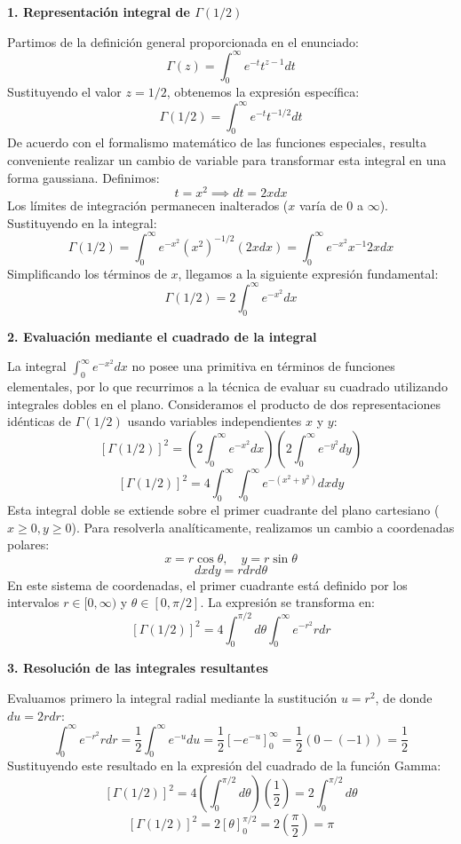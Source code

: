 \documentclass[a4paper]{article}
\begin{document}
\textbf{1. Representación integral de $\Gamma(1/2)$}

Partimos de la definición general proporcionada en el enunciado:
$$ \Gamma(z) = \int_{0}^{\infty} e^{-t} t^{z-1} dt $$
Sustituyendo el valor $z = 1/2$, obtenemos la expresión específica:
$$ \Gamma(1/2) = \int_{0}^{\infty} e^{-t} t^{-1/2} dt $$
De acuerdo con el formalismo matemático de las funciones especiales, resulta conveniente realizar un cambio de variable para transformar esta integral en una forma gaussiana. Definimos:
$$ t = x^2 \implies dt = 2x dx $$
Los límites de integración permanecen inalterados ($x$ varía de $0$ a $\infty$). Sustituyendo en la integral:
$$ \Gamma(1/2) = \int_{0}^{\infty} e^{-x^2} (x^2)^{-1/2} (2x dx) = \int_{0}^{\infty} e^{-x^2} x^{-1} 2x dx $$
Simplificando los términos de $x$, llegamos a la siguiente expresión fundamental:
$$ \Gamma(1/2) = 2 \int_{0}^{\infty} e^{-x^2} dx $$

\textbf{2. Evaluación mediante el cuadrado de la integral}

La integral $\int_{0}^{\infty} e^{-x^2} dx$ no posee una primitiva en términos de funciones elementales, por lo que recurrimos a la técnica de evaluar su cuadrado utilizando integrales dobles en el plano. Consideramos el producto de dos representaciones idénticas de $\Gamma(1/2)$ usando variables independientes $x$ y $y$:
$$ [\Gamma(1/2)]^2 = \left( 2 \int_{0}^{\infty} e^{-x^2} dx \right) \left( 2 \int_{0}^{\infty} e^{-y^2} dy \right) $$
$$ [\Gamma(1/2)]^2 = 4 \int_{0}^{\infty} \int_{0}^{\infty} e^{-(x^2+y^2)} dx dy $$
Esta integral doble se extiende sobre el primer cuadrante del plano cartesiano ($x \ge 0, y \ge 0$). Para resolverla analíticamente, realizamos un cambio a coordenadas polares:
$$ x = r \cos \theta, \quad y = r \sin \theta $$
$$ dx dy = r dr d\theta $$
En este sistema de coordenadas, el primer cuadrante está definido por los intervalos $r \in [0, \infty)$ y $\theta \in [0, \pi/2]$. La expresión se transforma en:
$$ [\Gamma(1/2)]^2 = 4 \int_{0}^{\pi/2} d\theta \int_{0}^{\infty} e^{-r^2} r dr $$

\textbf{3. Resolución de las integrales resultantes}

Evaluamos primero la integral radial mediante la sustitución $u = r^2$, de donde $du = 2r dr$:
$$ \int_{0}^{\infty} e^{-r^2} r dr = \frac{1}{2} \int_{0}^{\infty} e^{-u} du = \frac{1}{2} [-e^{-u}]_{0}^{\infty} = \frac{1}{2} (0 - (-1)) = \frac{1}{2} $$
Sustituyendo este resultado en la expresión del cuadrado de la función Gamma:
$$ [\Gamma(1/2)]^2 = 4 \left( \int_{0}^{\pi/2} d\theta \right) \left( \frac{1}{2} \right) = 2 \int_{0}^{\pi/2} d\theta $$
$$ [\Gamma(1/2)]^2 = 2 [\theta]_{0}^{\pi/2} = 2 \left( \frac{\pi}{2} \right) = \pi $$
\end{document}
